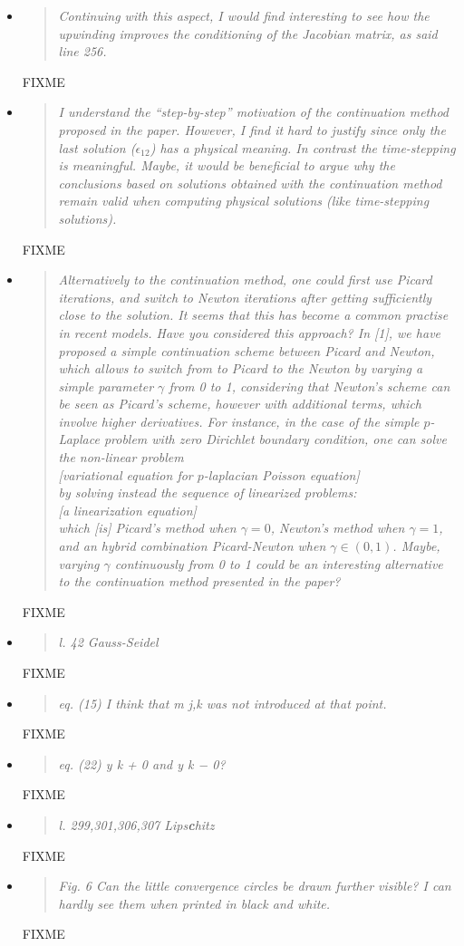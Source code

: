 \documentclass[11pt,reqno]{amsart}
\newcommand{\reply}[2]{
\medskip\medskip
\item  \begin{quote}
\emph{#1}
\end{quote}

\medskip
\noindent #2}
\begin{document}
\begin{itemize}
\reply{Continuing with this aspect, I would find interesting to see how the upwinding
improves the conditioning of the Jacobian matrix, as said line 256.}
{FIXME}

\reply{I understand the ``step-by-step'' motivation of the continuation method proposed
in the paper.  However, I find it hard to justify since only the last solution ($\epsilon_{12}$)
has a physical meaning.  In contrast the time-stepping is meaningful.  Maybe,
it would be beneficial to argue why the conclusions based on solutions obtained
with the continuation method remain valid when computing physical solutions
(like time-stepping solutions).}
{FIXME}

\reply{Alternatively to the continuation method, one could first use Picard iterations,
and switch to Newton iterations after getting sufficiently close to the solution.
It seems that this has become a common practise in recent models. Have you
considered this approach? In [1], we have proposed a simple continuation scheme
between Picard and Newton, which allows to switch from to Picard to the Newton
by varying a simple parameter $\gamma$ from 0 to 1, considering that Newton’s scheme
can be seen as Picard’s scheme, however with additional terms, which involve
higher derivatives. For instance, in the case of the simple $p$-Laplace problem with
zero Dirichlet boundary condition, one can solve the non-linear problem \medskip \\
\phantom{foobar} [\emph{variational equation for $p$-laplacian Poisson equation}] \medskip \\
by solving instead the sequence of linearized problems: \medskip \\
\phantom{foobar} [\emph{a linearization equation}] \medskip \\
which [is] Picard's method when $\gamma=0$, Newton’s method when $\gamma=1$,
and an hybrid combination Picard-Newton when $\gamma \in (0,1)$.  Maybe, varying $\gamma$
continuously from 0 to 1 could be an interesting alternative to the continuation
method presented in the paper?}
{FIXME}

\reply{l. 42 Gauss-Seidel}
{FIXME}

\reply{eq. (15) I think that m j,k was not introduced at that point.}
{FIXME}

\reply{eq. (22) y k + 0 and y k − 0?}
{FIXME}

\reply{l. 299,301,306,307 Lips\textbf{c}hitz}
{FIXME}

\reply{Fig. 6 Can the little convergence circles be drawn further visible? I can hardly see them
when printed in black and white.}
{FIXME}


\end{itemize}
\end{document}
